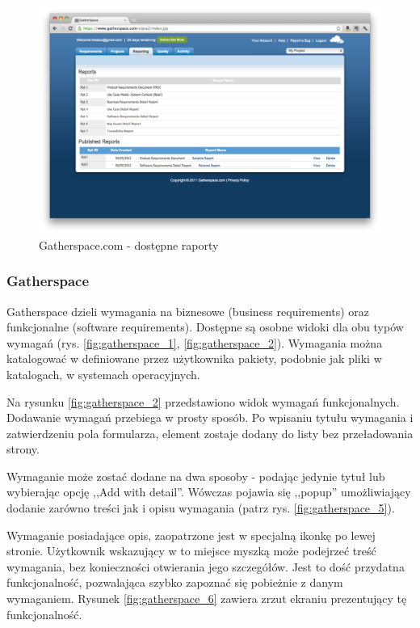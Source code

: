       \begin{figure}[t]
        \centering
        \includegraphics[width=1.0\textwidth]{img/gatherspace_11.pdf}
        \caption{Gatherspace.com - dostępne raporty}
        \label{fig:gatherspace_11}
      \end{figure}

      \subsubsection{Gatherspace}
        Gatherspace dzieli wymagania na biznesowe (business requirements) oraz funkcjonalne (software requirements). Dostępne są osobne widoki dla obu typów wymagań (rys. \ref{fig:gatherspace_1}, \ref{fig:gatherspace_2}). Wymagania można katalogować w definiowane przez użytkownika pakiety, podobnie jak pliki w katalogach, w systemach operacyjnych. 


        Na rysunku \ref{fig:gatherspace_2} przedstawiono widok wymagań funkcjonalnych. Dodawanie wymagań przebiega w prosty sposób. Po wpisaniu tytułu wymagania i zatwierdzeniu pola formularza, element zostaje dodany do listy bez przeładowania strony.

        Wymaganie może zostać dodane na dwa sposoby - podając jedynie tytuł lub wybierając opcję ,,Add with detail''. Wówczas pojawia się ,,popup'' umożliwiający dodanie zarówno treści jak i opisu wymagania (patrz rys. \ref{fig:gatherspace_5}).

        Wymaganie posiadające opis, zaopatrzone jest w specjalną ikonkę po lewej stronie. Użytkownik wskazujący w to miejsce myszką może podejrzeć treść wymagania, bez konieczności otwierania jego szczegółów. Jest to dość przydatna funkcjonalność, pozwalająca szybko zapoznać się pobieżnie z danym wymaganiem. Rysunek \ref{fig:gatherspace_6} zawiera zrzut ekraniu prezentujący tę funkcjonalność. 
        
